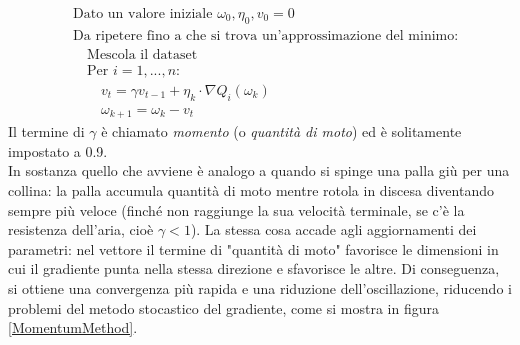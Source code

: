 \begin{align*}
    &\text{Dato un valore iniziale }\omega_0, \eta_0, v_0=0\\
    &\text{Da ripetere fino a che si trova un'approssimazione del minimo:}\\
    &\quad\text{Mescola il dataset}\\
    &\quad\text{Per }i=1,...,n:\\
    & \quad\quad v_t=\gamma v_{t-1}+\eta_k\cdot \nabla Q_i(\omega_k)\\
    &\quad\quad\omega_{k+1}=\omega_k - v_t
\end{align*}
Il termine di $\gamma$ è chiamato \textit{momento} (o \textit{quantità di moto}) ed è solitamente impostato a 0.9.\\
In sostanza quello che avviene è analogo a quando si spinge una palla giù per una collina: la palla accumula quantità di moto
mentre rotola in discesa  diventando sempre più veloce (finché non raggiunge la sua velocità terminale, se c'è
la resistenza dell'aria, cioè $\gamma<1$). La stessa cosa accade agli aggiornamenti dei parametri: nel vettore il termine di "quantità di moto" favorisce le dimensioni in cui il gradiente punta nella stessa direzione e sfavorisce le altre. Di conseguenza, si ottiene una convergenza più rapida e una riduzione dell'oscillazione, riducendo i problemi del metodo stocastico del gradiente, come si mostra in figura \ref{MomentumMethod}.

